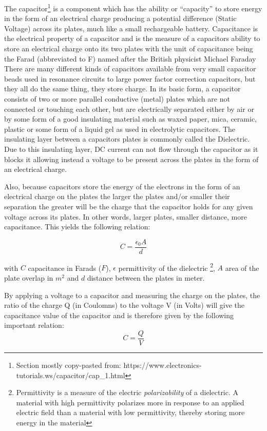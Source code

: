 The capacitor\footnote{Section mostly copy-pasted from: https://www.electronics-tutorials.ws/capacitor/cap_1.html} is a component which has the ability or “capacity” to store energy in the form of an electrical charge producing a potential difference (Static Voltage) across its plates, much like a small rechargeable battery.
Capacitance is the electrical property of a capacitor and is the measure of a capacitors ability to store an electrical charge onto its two plates with the unit of capacitance being the Farad (abbreviated to F) named after the British physicist Michael Faraday
There are many different kinds of capacitors available from very small capacitor beads used in resonance circuits to large power factor correction capacitors, but they all do the same thing, they store charge.
In its basic form, a capacitor consists of two or more parallel conductive (metal) plates which are not connected or touching each other, but are electrically separated either by air or by some form of a good insulating material such as waxed paper, mica, ceramic, plastic or some form of a liquid gel as used in electrolytic capacitors. The insulating layer between a capacitors plates is commonly called the Dielectric.
Due to this insulating layer, DC current can not flow through the capacitor as it blocks it allowing instead a voltage to be present across the plates in the form of an electrical charge.

Also, because capacitors store the energy of the electrons in the form of an electrical charge on the plates the larger the plates and/or smaller their separation the greater will be the charge that the capacitor holds for any given voltage across its plates. In other words, larger plates, smaller distance, more capacitance. This yields the following relation:

\begin{equation}
    C = \frac{\epsilon_0 A}{d}
\end{equation}

with $C$ capacitance in Farads ($F$), $\epsilon$ permittivity of the dielectric \footnote{Permittivity is a measure of the electric \textit{polarizability} of a dielectric. A material with high permittivity polarizes more in response to an applied electric field than a material with low permittivity, thereby storing more energy in the material}, $A$ area of the plate overlap in $m^2$ and $d$ distance between the plates in meter. 

By applying a voltage to a capacitor and measuring the charge on the plates, the ratio of the charge Q (in Coulomns) to the voltage V (in Volts) will give the capacitance value of the capacitor and is therefore given by the following important relation: 
\begin{equation*}
    C = \frac{Q}{V}
\end{equation*}

